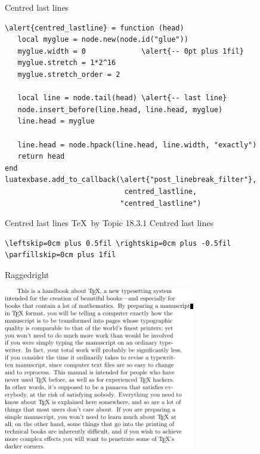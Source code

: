 \documentclass[t,10pt]{beamer}
\begin{document}
\begin{frame}[fragile]{Centred last lines}
  \begin{Verbatim}[fontsize=\small,commandchars=\\\{\}]
\alert{centred_lastline} = function (head)
   local myglue = node.new(node.id("glue"))
   myglue.width = 0             \alert{-- 0pt plus 1fil}
   myglue.stretch = 1*2^16
   myglue.stretch_order = 2

   local line = node.tail(head) \alert{-- last line}
   node.insert_before(line.head, line.head, myglue)
   line.head = myglue

   line.head = node.hpack(line.head, line.width, "exactly")
   return head
end
luatexbase.add_to_callback(\alert{"post_linebreak_filter"},
                            centred_lastline,
                           "centred_lastline")
  \end{Verbatim}
\end{frame}

\begin{frame}[fragile]{Centred last lines}
  \alert{\TeX\ by Topic} 18.3.1 Centred last lines
  \begin{Verbatim}[fontsize=\small]
\leftskip=0cm plus 0.5fil \rightskip=0cm plus -0.5fil
\parfillskip=0cm plus 1fil
  \end{Verbatim}
\end{frame}

\begin{frame}[fragile]{Raggedright}
  \begin{center}
    \includegraphics[width=3.3in]{victor_ragg.pdf}
  \end{center}
\end{frame}
\end{document}
